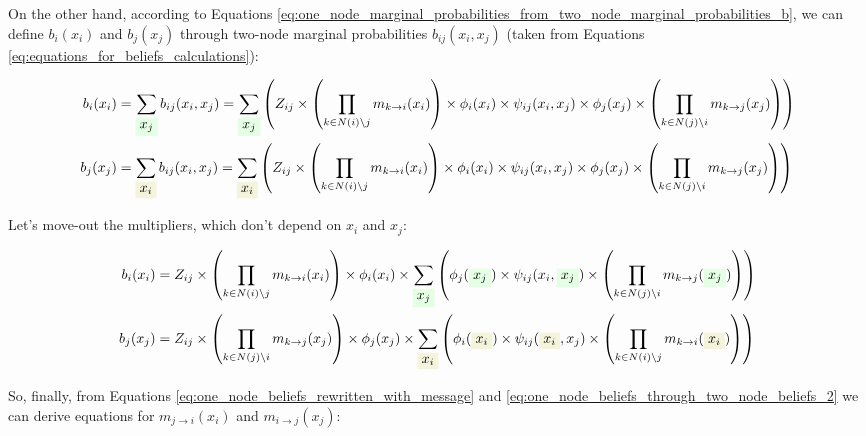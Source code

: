 \documentclass[fleqn,leqno]{article}
\newcommand{\highlight}[1]{\colorbox{green!10}{$\displaystyle#1$}}
\newcommand{\highlightred}[1]{\colorbox{olive!10}{$\displaystyle#1$}}
\begin{document}
On the other hand, according to Equations \eqref{eq:one_node_marginal_probabilities_from_two_node_marginal_probabilities_b}, we can define $b_i(x_i)$ and $b_j(x_j)$ through two-node marginal probabilities $b_{ij}(x_i, x_j)$ (taken from Equations \eqref{eq:equations_for_beliefs_calculations}):

\begin{equation} \label{eq:one_node_beliefs_through_two_node_beliefs_1}
\begin{split}
b_i(x_i) & = \sum_{\highlight{x_j}} b_{ij}(x_i, x_j) = \sum_{\highlight{x_j}} \left( Z_{ij} \times \left( \prod_{k \in N(i) \setminus j} m_{k \rightarrow i}(x_i) \right) \times \phi_i(x_i) \times \psi_{ij}(x_i, x_j) \times \phi_j(x_j) \times \left( \prod_{k \in N(j) \setminus i} m_{k \rightarrow j}(x_j) \right) \right) \\
b_j(x_j) & = \sum_{\highlightred{x_i}} b_{ij}(x_i, x_j) = \sum_{\highlightred{x_i}} \left( Z_{ij} \times \left( \prod_{k \in N(i) \setminus j} m_{k \rightarrow i}(x_i) \right) \times \phi_i(x_i) \times \psi_{ij}(x_i, x_j) \times \phi_j(x_j) \times \left( \prod_{k \in N(j) \setminus i} m_{k \rightarrow j}(x_j) \right) \right)  \\
\end{split}
\end{equation}

Let's move-out the multipliers, which don't depend on $x_i$ and $x_j$:

\begin{equation} \label{eq:one_node_beliefs_through_two_node_beliefs_2}
\begin{split}
b_i(x_i) & = Z_{ij} \times \left( \prod_{k \in N(i) \setminus j} m_{k \rightarrow i}(x_i) \right) \times \phi_i(x_i) \times \sum_{\highlight{x_j}} \left( \phi_j(\highlight{x_j}) \times \psi_{ij}(x_i, \highlight{x_j}) \times \left( \prod_{k \in N(j) \setminus i} m_{k \rightarrow j}(\highlight{x_j}) \right) \right) \\
b_j(x_j) & = Z_{ij} \times \left( \prod_{k \in N(j) \setminus i} m_{k \rightarrow j}(x_j) \right) \times \phi_j(x_j) \times \sum_{\highlightred{x_i}} \left( \phi_i(\highlightred{x_i}) \times \psi_{ij}(\highlightred{x_i}, x_j) \times \left( \prod_{k \in N(i) \setminus j} m_{k \rightarrow i}(\highlightred{x_i}) \right) \right)  \\
\end{split}
\end{equation}

So, finally, from Equations \eqref{eq:one_node_beliefs_rewritten_with_message} and \eqref{eq:one_node_beliefs_through_two_node_beliefs_2} we can derive equations for $m_{j \rightarrow i}(x_i)$ and $m_{i \rightarrow j}(x_j)$:
\end{document}
